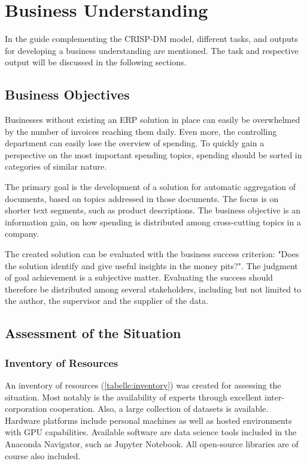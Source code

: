 \chapter{Business Understanding}
In the guide complementing the \ac{CRISP-DM} model, different tasks, and outputs for developing a business understanding are mentioned. The task and respective output will be discussed in the following sections.

\section{Business Objectives}
\label{section:business-objectives}
Businesses without existing an \ac{ERP} solution in place can easily be overwhelmed by the number of invoices reaching them daily. Even more, the controlling department can easily lose the overview of spending. To quickly gain a perspective on the most important spending topics, spending should be sorted in categories of similar nature.

The primary goal is the development of a solution for automatic aggregation of documents, based on topics addressed in those documents. The focus is on shorter text segments, such as product descriptions. The business objective is an information gain, on how spending is distributed among cross-cutting topics in a company.

The created solution can be evaluated with the business success criterion: "Does the solution identify and give useful insights in the money pits?". The judgment of goal achievement is a subjective matter. Evaluating the success should therefore be distributed among several stakeholders, including but not limited to the author, the supervisor and the supplier of the data.

\section{Assessment of the Situation}

\subsection{Inventory of Resources}
An inventory of resources (\ref{tabelle:inventory}) was created for assessing the situation. Most notably is the availability of experts through excellent inter-corporation cooperation. Also, a large collection of datasets is available. Hardware platforms include personal machines as well as hosted environments with GPU capabilities. Available software are data science tools included in the Anaconda Navigator, such as Jupyter Notebook. All open-source libraries are of course also included.

